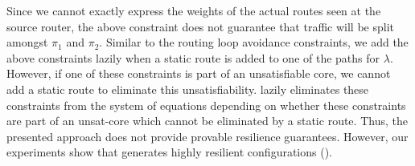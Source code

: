 Since we cannot exactly express the weights of the actual routes seen 
at the source router, the above constraint does not  guarantee 
that traffic will be split amongst
$\pi_1$ and $\pi_2$. 
Similar to the routing loop avoidance constraints, we add the
above constraints lazily when a static route is added to one of the
paths for $\lambda$. However, if one of these constraints is part of 
an unsatisfiable core, we cannot add a static route to eliminate 
this unsatisfiability. \name lazily eliminates these constraints from the
system of equations depending on whether these constraints are part of 
an unsat-core which cannot be eliminated by a static route. 
Thus, the presented approach does not provide provable 
resilience guarantees. However, our experiments show that
\name generates highly resilient configurations (). 

